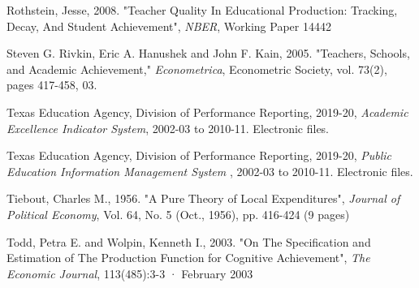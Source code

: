 \documentclass[11pt]{article}
\begin{document}
\begin{thebibliography}{9}
Rothstein, Jesse, 2008.
"Teacher Quality In Educational Production: Tracking, Decay, And Student Achievement",
\textit{NBER}, Working Paper 14442


Steven G. Rivkin, Eric A. Hanushek and John F. Kain, 2005. 
"Teachers, Schools, and Academic Achievement," 
\textit{Econometrica}, Econometric Society, vol. 73(2), pages 417-458, 03.


Texas Education Agency, Division of Performance Reporting, 2019-20,
\textit{Academic Excellence Indicator System}, 2002-03 to 2010-11. Electronic files.

Texas Education Agency, Division of Performance Reporting, 2019-20,
\textit{Public Education Information Management System }, 2002-03 to 2010-11. Electronic files.

Tiebout, Charles M., 1956.
"A Pure Theory of Local Expenditures",
\textit{Journal of Political Economy}, Vol. 64, No. 5 (Oct., 1956), pp. 416-424 (9 pages)

Todd, Petra E. and Wolpin, Kenneth I., 2003.
"On The Specification and Estimation of The Production Function for Cognitive Achievement",
\textit{The Economic Journal}, 113(485):3-3 · February 2003





 



\end{thebibliography}
\end{document}
